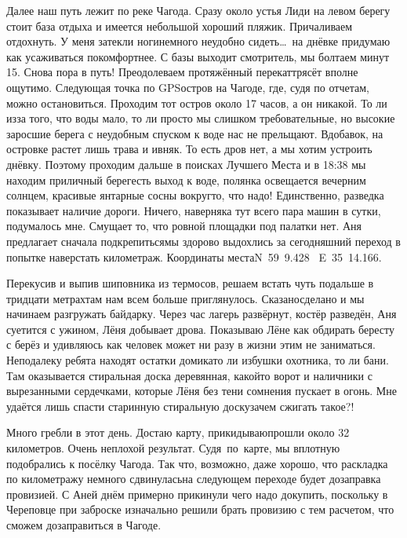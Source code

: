 Далее наш путь лежит по реке Чагода. Сразу около устья Лиди на левом берегу стоит база отдыха и имеется небольшой хороший пляжик. Причаливаем отдохнуть. У меня затекли ноги\mdash немного неудобно сидеть\ldots~на днёвке придумаю как усаживаться покомфортнее. С базы выходит смотритель, мы болтаем минут 15. Снова пора в путь! Преодолеваем протяжённый перекат\mdash трясёт вполне ощутимо. Следующая точка по GPS\mdash остров на Чагоде, где, судя по отчетам, можно остановиться. Проходим тот остров около 17 часов, а он никакой. То ли из\sdash за того, что воды мало, то ли просто мы слишком требовательные, но высокие заросшие берега с неудобным спуском к воде нас не прельщают. Вдобавок, на островке растет лишь трава и ивняк. То есть дров нет, а мы хотим устроить днёвку. Поэтому проходим дальше в поисках Лучшего Места и в 18:38 мы находим приличный берег\mdash есть выход к воде, полянка освещается вечерним солнцем, красивые янтарные сосны вокруг\mdash то, что надо! Единственно, разведка показывает наличие дороги. Ничего, наверняка тут всего пара машин в сутки, подумалось мне. Смущает то, что ровной площадки под палатки нет. Аня предлагает сначала подкрепиться\mdash мы здорово выдохлись за сегодняшний переход в попытке наверстать километраж. Координаты места\mdash N~59\degree~9.428\textprime~ E~35\degree~14.166\textprime.

Перекусив и выпив шиповника из термосов, решаем встать чуть подальше в тридцати метрах\mdash там нам всем больше приглянулось. Сказано\sdash сделано и мы начинаем разгружать байдарку. Через час лагерь развёрнут, костёр разведён, Аня суетится с ужином, Лёня добывает дрова. Показываю Лёне как обдирать бересту с берёз и удивляюсь как человек может ни разу в жизни этим не заниматься. Неподалеку ребята находят остатки домика\mdash то ли избушки охотника, то ли бани. Там оказывается стиральная доска деревянная, какой\sdash то ворот и наличники с вырезанными сердечками, которые Лёня без тени сомнения пускает в огонь. Мне удаётся лишь спасти старинную стиральную доску\mdash зачем сжигать такое?! 

Много гребли в этот день. Достаю карту, прикидываю\mdash прошли около 32 километров. Очень неплохой результат. Судя~по~карте, мы вплотную подобрались к посёлку Чагода. Так что, возможно, даже хорошо, что раскладка по километражу немного сдвинулась\mdash на следующем переходе будет дозаправка провизией. С Аней днём примерно прикинули чего надо докупить, поскольку в Череповце при заброске изначально решили брать провизию с тем расчетом, что сможем дозаправиться в Чагоде.

